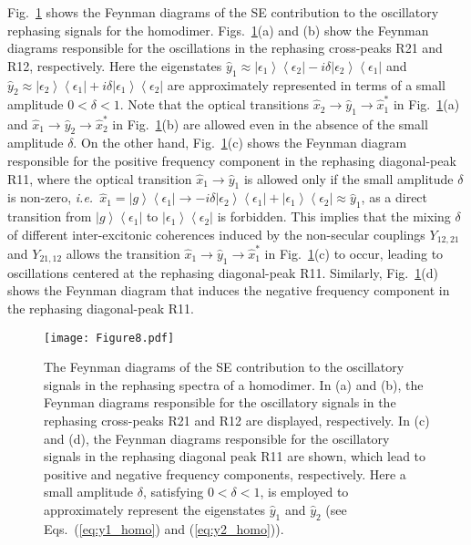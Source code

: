 \documentclass[%
 reprint,%
 amssymb, amsmath,%
 aip,cha,%
]{revtex4-1}
\newcommand{\bra}[1]{\ensuremath{\left\langle{#1}\right\vert}}
\newcommand{\ket}[1]{\ensuremath{\left|{#1}\right\rangle}}
\begin{document}
Fig.~\ref{figureindex8} shows the Feynman diagrams of the SE contribution to the oscillatory rephasing signals for the homodimer. Figs.~\ref{figureindex8}(a) and (b) show the Feynman diagrams responsible for the oscillations in the rephasing cross-peaks R21 and R12, respectively. Here the eigenstates $\hat{y}_{1}\approx\ket{\epsilon_1}\bra{\epsilon_2}-i\delta\ket{\epsilon_2}\bra{\epsilon_1}$ and $\hat{y}_{2}\approx\ket{\epsilon_2}\bra{\epsilon_1}+i\delta\ket{\epsilon_1}\bra{\epsilon_2}$ are approximately represented in terms of a small amplitude $0<\delta<1$. Note that the optical transitions $\hat{x}_{2}\rightarrow\hat{y}_{1}\rightarrow\hat{x}_{1}^{*}$ in Fig.~\ref{figureindex8}(a) and $\hat{x}_{1}\rightarrow\hat{y}_{2}\rightarrow\hat{x}_{2}^{*}$ in Fig.~\ref{figureindex8}(b) are allowed even in the absence of the small amplitude $\delta$. On the other hand, Fig.~\ref{figureindex8}(c) shows the Feynman diagram responsible for the positive frequency component in the rephasing diagonal-peak R11, where the optical transition $\hat{x}_{1}\rightarrow\hat{y}_{1}$ is allowed only if the small amplitude $\delta$ is non-zero, {\it i.e.}~$\hat{x}_{1}=\ket{g}\bra{\epsilon_1}\rightarrow-i\delta\ket{\epsilon_2}\bra{\epsilon_1}+\ket{\epsilon_1}\bra{\epsilon_2}\approx\hat{y}_{1}$, as a direct transition from $\ket{g}\bra{\epsilon_1}$ to $\ket{\epsilon_1}\bra{\epsilon_2}$ is forbidden. This implies that the mixing $\delta$ of different inter-excitonic coherences induced by the non-secular couplings $Y_{12,21}$ and $Y_{21,12}$ allows the transition $\hat{x}_{1}\rightarrow\hat{y}_{1}\rightarrow\hat{x}_{1}^{*}$ in Fig.~\ref{figureindex8}(c) to occur, leading to oscillations centered at the rephasing diagonal-peak R11. Similarly, Fig.~\ref{figureindex8}(d) shows the Feynman diagram that induces the negative frequency component in the rephasing diagonal-peak R11.

\begin{figure}[ht!]
	\texttt{[image: Figure8.pdf]}
	\caption{The Feynman diagrams of the SE contribution to the oscillatory signals in the rephasing spectra of a homodimer. In (a) and (b), the Feynman diagrams responsible for the oscillatory signals in the rephasing cross-peaks R21 and R12 are displayed, respectively. In (c) and (d), the Feynman diagrams responsible for the oscillatory signals in the rephasing diagonal peak R11 are shown, which lead to positive and negative frequency components, respectively. Here a small amplitude $\delta$, satisfying $0<\delta<1$, is employed to approximately represent the eigenstates $\hat{y}_{1}$ and $\hat{y}_{2}$ (see Eqs.~(\ref{eq:y1_homo}) and (\ref{eq:y2_homo})).}
	\label{figureindex8} 
\end{figure}
\end{document}
